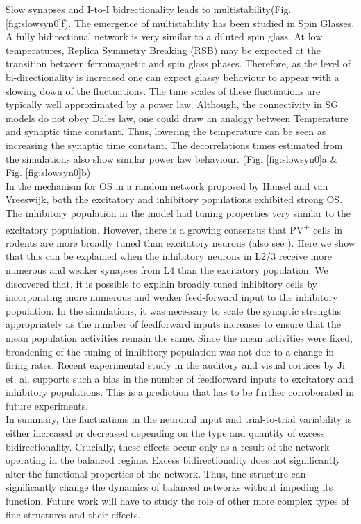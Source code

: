 Slow synapses and I-to-I bidrectionality leads to multistability(Fig. \ref{fig:slowsyn0}f). The emergence of multistability has been studied in Spin Glasses. A fully bidirectional network is very similar to a diluted spin glass\cite{megard1987spin}. At low temperatures, Replica Symmetry Breaking (RSB) may be expected at the transition between ferromagnetic and spin glass phases. Therefore, as the level of bi-directionality is increased one can expect glassy behaviour to appear with a slowing down of the fluctuations\cite{Crisanti1987, Crisanti1988}. The time scales of these fluctuations are typically well approximated by a power law. Although, the connectivity in SG models do not obey Dales law, one could draw an analogy between Temperature and synaptic time constant. Thus, lowering the temperature can be seen as increasing the synaptic time constant. The decorrelations times estimated from the simulations also show similar power law behaviour. (Fig. \ref{fig:slowsyn0}a \& Fig. \ref{fig:slowsyn0}b) \\

In the mechanism for OS in a random network proposed by Hansel and van Vreeswijk, both the excitatory and inhibitory populations exhibited strong OS. The inhibitory population in the model had tuning properties very similar to the excitatory population. However, there is a growing consensus that PV\textsuperscript{+} cells in rodents are more broadly tuned than excitatory neurons \cite{niell2008highly, kerlin2010broadly, liu2009visual, sohya2007gabaergic, kameyama2010difference} (also see \cite{Runyan2010, Ma2010}). Here we show that this can be explained when the inhibitory neurons in L2/3 receive more numerous and weaker synapses from L4 than the excitatory population.  We discovered that, it is possible to explain broadly tuned inhibitory cells by incorporating more numerous and weaker feed-forward input to the inhibitory population. In the simulations, it was necessary to scale the synaptic strengths appropriately as the number of feedforward inputs increases to ensure that the mean population activities remain the same. Since the mean activities were fixed, broadening of the tuning of inhibitory population was not due to a change in firing rates. Recent experimental study in the auditory and visual cortices by Ji et. al. \cite{Ji2015} supports such a bias in the number of feedforward inputs to excitatory and inhibitory populations. This is a prediction that has to be further corroborated in future experiments. \\

In summary, the fluctuations in the neuronal input and trial-to-trial variability is either increased or decreased depending on the type and quantity of excess bidirectionality. Crucially, these effects occur only as a result of the network operating in the balanced regime. Excess bidirectionality does not significantly alter the functional properties of the network. Thus, fine structure can significantly change the dynamics of balanced networks without impeding its function. Future work will have to study the role of other more complex types of fine structures and their effects. 